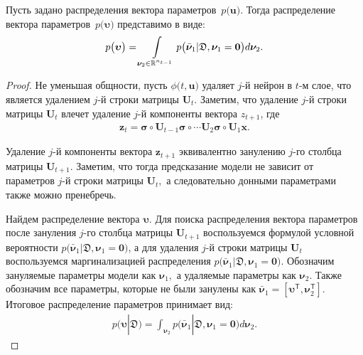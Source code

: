 \begin{theorem}
Пусть задано распределения вектора параметров~$p\bigr(\mathbf{u}\bigr).$ Тогда распределение вектора параметров~$p\bigr(\bm{\upsilon}\bigr)$ представимо в виде:
\[
\setlength\abovedisplayskip{0pt}
p\bigr(\bm{\upsilon}\bigr)  = \int\limits_{ \bm{\nu}_2 \in \mathbb{R}^{n_{t-1}}}p\bigr(\bar{\bm{\nu}}_1|\mathfrak{D}, \bm{\nu}_1=\mathbf{0}\bigr) d \bm{\nu}_2.
\setlength\belowdisplayskip{0pt}
\]
\end{theorem}
\begin{proof}
Не уменьшая общности, пусть $\phi\bigr(t, \mathbf{u}\bigr)$ удаляет $j$-й нейрон в $t$-м слое, что является удалением $j$-й строки матрицы $\mathbf{U}_t$. Заметим, что удаление $j$-й строки матрицы $\mathbf{U}_t$ влечет удаление $j$-й компоненты вектора $z_{t+1}$, где
\[
\label{eq:ap:tr:neural:1}
\begin{aligned}
\mathbf{z}_{t} = \bm{\sigma} \circ \mathbf{U}_{t-1} \bm{\sigma} \circ \cdots  \mathbf{U}_2\bm{\sigma} \circ \mathbf{U}_1\mathbf{x}.
\end{aligned}
\]

Удаление $j$-й компоненты вектора $\mathbf{z}_{t+1}$ эквивалентно занулению $j$-го столбца матрицы $\mathbf{U}_{t+1}.$ Заметим, что тогда предсказание модели не зависит от параметров $j$-й строки матрицы $\mathbf{U}_t,$ а следовательно донными параметрами также можно пренебречь.

Найдем распределение вектора $\bm{\upsilon}.$ Для поиска распределения вектора параметров после зануления $j$-го столбца матрицы $\mathbf{U}_{t+1}$ воспользуемся формулой условной вероятности $p\bigr(\bar{\bm{\nu}}_1|\mathfrak{D}, \bm{\nu}_1=\mathbf{0}\bigr)$, а для удаления $j$-й строки матрицы $\mathbf{U}_{t}$ воспользуемся маргинализацией распределения $p\bigr(\bar{\bm{\nu}}_1|\mathfrak{D}, \bm{\nu}_1=\mathbf{0}\bigr)$. Обозначим зануляемые параметры модели как $\bm{\nu}_1,$ а удаляемые параметры как $\bm{\nu}_2.$ Также обозначим все параметры, которые не были занулены как $\bar{\bm{\nu}}_1 = [\bm{\upsilon}^{\mathsf{T}}, \bm{\nu}_2^{\mathsf{T}}].$ Итоговое распределение параметров принимает  вид:
\[
\label{eq:ap:tr:1:1}
\begin{aligned}
p\bigr(\bm{\upsilon}|\mathfrak{D}\bigr)  = \int_{\bm{\nu}_2}p\bigr(\bar{\bm{\nu}}_1|\mathfrak{D}, \bm{\nu}_1=\mathbf{0}\bigr) d\bm{\nu}_2.
\end{aligned}
\]
\end{proof}

